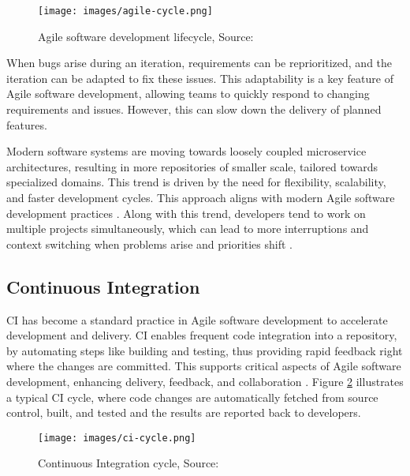 \begin{figure}[H]
    \centering
    \texttt{[image: images/agile-cycle.png]}
    \caption{Agile software development lifecycle, Source: \cite{7MistakesIve2020}}
    \label{fig:agile-cycle}
\end{figure}

When bugs arise during an iteration, requirements can be reprioritized, and the iteration can be adapted to fix these issues. This adaptability is a key feature of Agile software development, allowing teams to quickly respond to changing requirements and issues. However, this can slow down the delivery of planned features. %

Modern software systems are moving towards loosely coupled microservice architectures, resulting in more repositories of smaller scale, tailored towards specialized domains. This trend is driven by the need for flexibility, scalability, and faster development cycles. This approach aligns with modern Agile software development practices \cite{francescoResearchArchitectingMicroservices2017}. Along with this trend, developers tend to work on multiple projects simultaneously, which can lead to more interruptions and context switching when problems arise and priorities shift \cite{tregubovImpactTaskSwitching2017, vasilescuSkyNotLimit2016}.

\subsection{Continuous Integration}

\Acf{CI} has become a standard practice in Agile software development to accelerate development and delivery. CI enables frequent code integration into a repository, by automating steps like building and testing, thus providing rapid feedback right where the changes are committed. This supports critical aspects of Agile software development, enhancing delivery, feedback, and collaboration \cite{ugwuezeContinuousIntegrationDeployment2024}. Figure \ref{fig:ci-cycle} illustrates a typical CI cycle, where code changes are automatically fetched from source control, built, and tested and the results are reported back to developers.

\begin{figure}[H]
    \centering
    \texttt{[image: images/ci-cycle.png]}
    \caption{Continuous Integration cycle, Source:~\cite{lovettTop12Benefits2023}}
    \label{fig:ci-cycle}
\end{figure}

